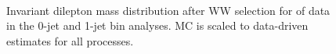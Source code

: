 \begin{figure}[!hbtp]
\centering
{}
 \\
\caption{Invariant dilepton mass distribution after WW selection for \intlumiEightTeV of data 
in the 0-jet  and 1-jet  bin analyses. 
MC is scaled to data-driven estimates for all processes.}
\label{fig:ww_dilmass}
\end{figure}

